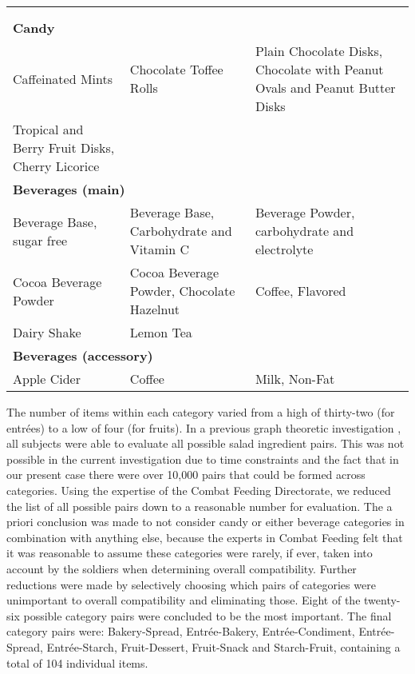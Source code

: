 \begin{landscape}
\begin{longtable}{p{7cm}p{7cm}p{7cm}}
\\
\\
\\
\multicolumn{3}{l}{\bf Candy} \\
\cmidrule(l){1-1}
Caffeinated Mints & Chocolate Toffee Rolls & Plain Chocolate Disks, Chocolate with Peanut Ovals and Peanut Butter Disks\\
Tropical and Berry Fruit Disks, Cherry Licorice\\
\midrule
\multicolumn{3}{l}{\bf Beverages (main)} \\
\cmidrule(l){1-1}
Beverage Base, sugar free & Beverage Base, Carbohydrate and Vitamin C & Beverage Powder, carbohydrate and electrolyte\\
Cocoa Beverage Powder & Cocoa Beverage Powder, Chocolate Hazelnut & Coffee, Flavored\\
Dairy Shake & Lemon Tea &\\
\midrule
\multicolumn{3}{l}{\bf Beverages (accessory)} \\
\cmidrule(l){1-1}
Apple Cider & Coffee & Milk, Non-Fat\\

\end{longtable}
\end{landscape}

The number of items within each category varied from a high of thirty-two (for entrées) to a low of four (for fruits).  In a previous graph theoretic investigation \citep{Nestrud2010a}, all subjects were able to evaluate all possible salad ingredient pairs.  This was not possible in the current investigation due to time constraints and the fact that in our present case there were over 10,000 pairs that could be formed across categories.  Using the expertise of the Combat Feeding Directorate, we reduced the list of all possible pairs down to a reasonable number for evaluation.  The a priori conclusion was made to not consider candy or either beverage categories in combination with anything else, because the experts in Combat Feeding felt that it was reasonable to assume these categories were rarely, if ever, taken into account by the soldiers when determining overall compatibility.  Further reductions were made by selectively choosing which pairs of categories were unimportant to overall compatibility and eliminating those.  Eight of the twenty-six possible category pairs were concluded to be the most important.  The final category pairs were: Bakery-Spread, Entrée-Bakery, Entrée-Condiment, Entrée-Spread, Entrée-Starch, Fruit-Dessert, Fruit-Snack and Starch-Fruit, containing a total of 104 individual items.

